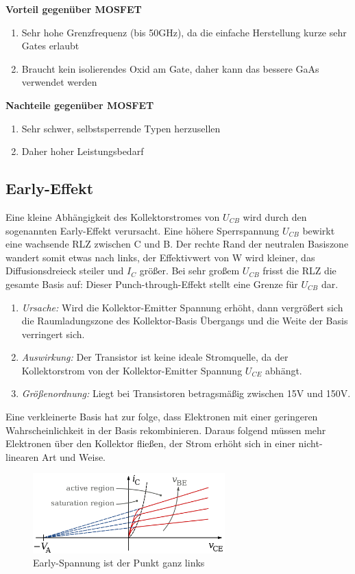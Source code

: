 \textbf{Vorteil gegenüber MOSFET}
\begin{enumerate}
    \item Sehr hohe Grenzfrequenz (bis 50GHz), da die einfache Herstellung kurze sehr Gates erlaubt
    \item Braucht kein isolierendes Oxid am Gate, daher kann das bessere GaAs verwendet werden
\end{enumerate}

\textbf{Nachteile gegenüber MOSFET}
\begin{enumerate}
    \item Sehr schwer, selbstsperrende Typen herzusellen
    \item Daher hoher Leistungsbedarf
\end{enumerate}

\subsection{Early-Effekt }\label{k6:early}
Eine kleine Abhängigkeit des Kollektorstromes von $U_{CB}$ wird durch den sogenannten
Early-Effekt verursacht. Eine höhere Sperrspannung $U_{CB}$ bewirkt eine wachsende RLZ
zwischen C und B. Der rechte Rand der neutralen Basiszone wandert somit etwas nach
links, der Effektivwert von W wird kleiner, das Diffusionsdreieck steiler und $I_C$ größer.
Bei sehr großem $U_{CB}$ frisst die RLZ die gesamte Basis auf: Dieser Punch-through-Effekt
stellt eine Grenze für $U_{CB}$ dar.

\begin{enumerate}
    \item \emph{Ursache:} Wird die Kollektor-Emitter Spannung erhöht, dann vergrößert sich die Raumladungszone des Kollektor-Basis Übergangs und die Weite der Basis verringert sich.
    \item \emph{Auswirkung:} Der Transistor ist keine ideale Stromquelle, da der Kollektorstrom von der Kollektor-Emitter Spannung $U_{CE}$ abhängt.
    \item \emph{Größenordnung:} Liegt bei Transistoren betragsmäßig zwischen 15V und 150V. 
\end{enumerate}

Eine verkleinerte Basis hat zur folge, dass Elektronen mit einer geringeren Wahrscheinlichkeit in der Basis rekombinieren.
Daraus folgend müssen mehr Elektronen über den Kollektor fließen, der Strom erhöht sich in einer nicht-linearen Art und Weise. 

    \begin{figure}
        \centering
        \includegraphics[width=0.66\textwidth]{fig/transistor-early-effect.png}
        \caption{Early-Spannung ist der Punkt ganz links}
        \label{fig:npnTransistorKennlinie}
    \end{figure}


